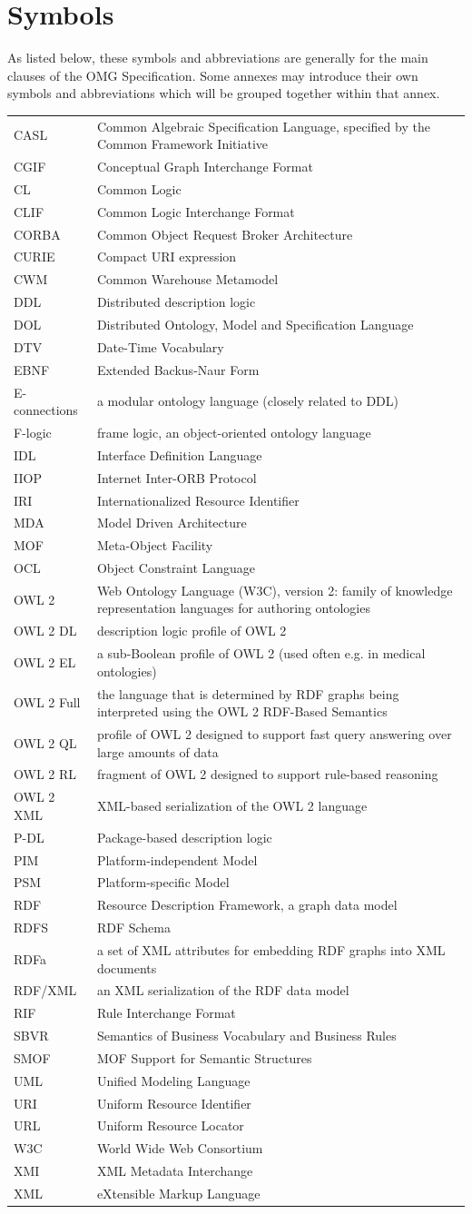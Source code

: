 \documentclass[10pt,fleqn,%
\ifpretendfinal
final%
\else
draft%
\fi,
]{scrreprt}
\makeatletter
\newcommand*{\eg}{e.g.\@\xspace}
\newcommand*{\IS}{OMG Specification\xspace}
\newenvironment{symbols}[0]{\begin{longtable}{p{.15\textwidth}p{.84\textwidth}}}{\end{longtable}}
\newcommand{\symboldef}[2]{ #1 & #2 \\}
\makeatother
\begin{document}
\chapter{Symbols}

As listed below, these symbols and abbreviations are generally for the main clauses of the \IS. Some annexes may introduce their own symbols and abbreviations which will be grouped together within that annex.

\begin{symbols}
\symboldef{CASL}{Common Algebraic Specification Language, specified by the Common Framework Initiative}
\symboldef{CGIF}{Conceptual Graph Interchange Format}
\symboldef{CL}{Common Logic }
\symboldef{CLIF}{Common Logic Interchange Format}
\symboldef{CORBA}{Common Object Request Broker Architecture}
\symboldef{CURIE}{Compact URI expression}
\symboldef{CWM}{Common Warehouse Metamodel}
\symboldef{DDL}{Distributed description logic}
\symboldef{DOL}{Distributed Ontology, Model and Specification Language}
\symboldef{DTV}{Date-Time Vocabulary}
\symboldef{EBNF}{Extended Backus-Naur Form}
\symboldef{E-connections}{a modular ontology language (closely related to DDL)}
\symboldef{F-logic}{frame logic, an object-oriented ontology language}
\symboldef{IDL}{Interface Definition Language}
\symboldef{IIOP}{Internet Inter-ORB Protocol}
\symboldef{IRI}{Internationalized Resource Identifier}
\symboldef{MDA}{Model Driven Architecture}
\symboldef{MOF}{Meta-Object Facility}
\symboldef{OCL}{Object Constraint Language}
\symboldef{OWL 2}{Web Ontology Language (W3C), version 2: family of knowledge representation languages for authoring ontologies}
\symboldef{OWL 2 DL}{description logic profile of OWL 2}
\symboldef{OWL 2 EL}{a sub-Boolean profile of OWL 2 (used often \eg in medical ontologies)}
\symboldef{OWL 2 Full}{the language that is determined by RDF graphs being interpreted 
using the OWL 2 RDF-Based Semantics \cite{W3C:REC-owl2-rdf-based-semantics-20091027}}
\symboldef{OWL 2 QL}{profile of OWL 2 designed to support fast query answering over large amounts of data}
\symboldef{OWL 2 RL}{fragment of OWL 2 designed to support rule-based reasoning}
\symboldef{OWL 2 XML}{XML-based serialization of the OWL 2 language}
\symboldef{P-DL}{Package-based description logic}
\symboldef{PIM}{Platform-independent Model}
\symboldef{PSM}{Platform-specific Model}
\symboldef{RDF}{Resource Description Framework, a graph data model}
\symboldef{RDFS}{RDF Schema}
\symboldef{RDFa}{a set of XML attributes for embedding RDF graphs into XML documents}
\symboldef{RDF/XML}{an XML serialization of the RDF data model}
\symboldef{RIF}{Rule Interchange Format}
\symboldef{SBVR}{Semantics of Business Vocabulary and Business Rules}
\symboldef{SMOF}{MOF Support for Semantic Structures}
\symboldef{UML}{Unified Modeling Language}
\symboldef{URI}{Uniform Resource Identifier}
\symboldef{URL}{Uniform Resource Locator}
\symboldef{W3C}{World Wide Web Consortium}
\symboldef{XMI}{XML Metadata Interchange}
\symboldef{XML}{eXtensible Markup Language}
\end{symbols}
\end{document}
